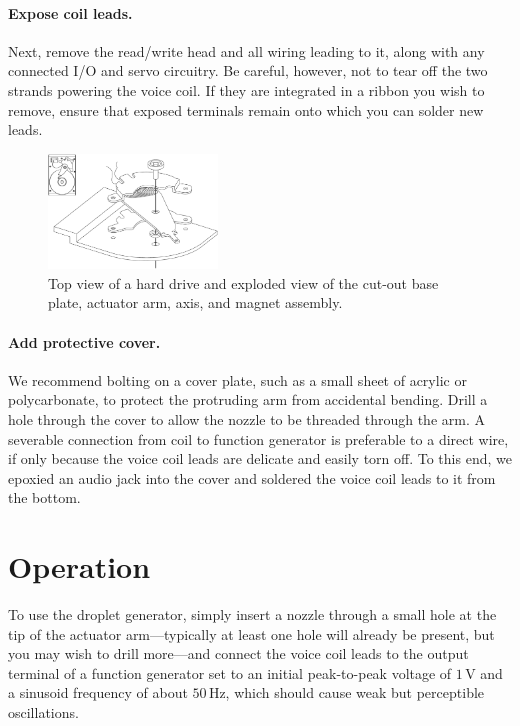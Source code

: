 \documentclass[aip,rsi,reprint,graphicx]{revtex4-1} %
\begin{document}
\paragraph{Expose coil leads.} Next, remove the read/write head and all
wiring leading to it, along with any connected I/O and servo circuitry. Be
careful, however, not to tear off the two strands powering the voice coil. If
they are integrated in a ribbon you wish to remove, ensure that exposed
terminals remain onto which you can solder new leads.
\begin{figure}
\centering
\includegraphics[width=0.4\textwidth]{hdg_images/dropletgenerator_exploded.pdf}
\caption{Top view of a hard drive and exploded view of the cut-out base
plate, actuator arm, axis, and magnet assembly. \label{fig:designschematic}}
\end{figure}
\paragraph{Add protective cover.} We recommend bolting on a cover plate, such
as a small sheet of acrylic or polycarbonate, to protect the protruding arm from
accidental bending. Drill a hole through the cover to allow the nozzle to be
threaded through the arm. A severable
connection from coil to function generator is preferable to a direct wire, if
only because the voice coil leads are delicate and easily torn off. To this end, we epoxied
an audio jack into the cover and soldered the voice coil leads to it from the
bottom. 

\section{Operation}
To use the droplet generator, simply insert a nozzle through a small hole at the
tip of the actuator arm---typically at least one hole will already be present, but you may wish to drill
more---and connect the voice coil leads to the output terminal of a function
generator set to an initial peak-to-peak voltage of $1\,$V and a sinusoid frequency of
about $50\,$Hz, which should cause weak but perceptible oscillations.
\end{document}
